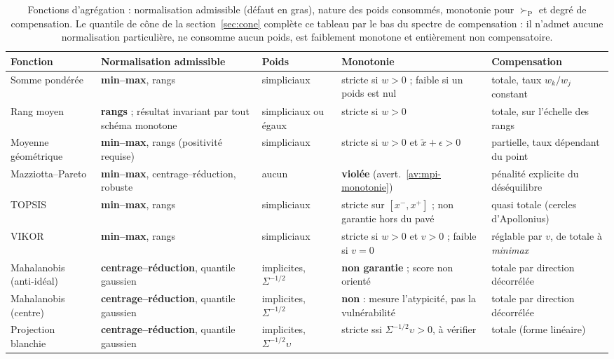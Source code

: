\documentclass[11pt,a4paper]{article}
\theoremstyle{definition}
\theoremstyle{remark}
\newcommand{\pareto}{\succ_{\mathrm{P}}}
\begin{document}
\medskip

\begin{table}[htbp]
  \centering
  \scriptsize
  \renewcommand{\arraystretch}{1.35}
  \begin{tabularx}{\textwidth}{@{}l Y l Y Y@{}}
    \toprule
    \textbf{Fonction} & \textbf{Normalisation admissible} & \textbf{Poids} &
    \textbf{Monotonie} & \textbf{Compensation} \\
    \midrule
    Somme pondérée &
    \textbf{min--max}, rangs &
    simpliciaux &
    stricte si $w > 0$ ; faible si un poids est nul &
    totale, taux $w_k/w_j$ constant \\
    Rang moyen &
    \textbf{rangs} ; résultat invariant par tout schéma monotone &
    simpliciaux ou égaux &
    stricte si $w > 0$ &
    totale, sur l'échelle des rangs \\
    Moyenne géométrique &
    \textbf{min--max}, rangs (positivité requise) &
    simpliciaux &
    stricte si $w > 0$ et $\tilde{x} + \epsilon > 0$ &
    partielle, taux dépendant du point \\
    Mazziotta--Pareto &
    \textbf{min--max}, centrage--réduction, robuste &
    aucun &
    \textbf{violée} (avert.~\ref{av:mpi-monotonie}) &
    pénalité explicite du déséquilibre \\
    TOPSIS &
    \textbf{min--max}, rangs &
    simpliciaux &
    stricte sur $[x^{-},x^{+}]$ ; non garantie hors du pavé &
    quasi totale (cercles d'Apollonius) \\
    VIKOR &
    \textbf{min--max}, rangs &
    simpliciaux &
    stricte si $w > 0$ et $v > 0$ ; faible si $v = 0$ &
    réglable par $v$, de totale à \emph{minimax} \\
    Mahalanobis (anti-idéal) &
    \textbf{centrage--réduction}, quantile gaussien &
    implicites, $\Sigma^{-1/2}$ &
    \textbf{non garantie} ; score non orienté &
    totale par direction décorrélée \\
    Mahalanobis (centre) &
    \textbf{centrage--réduction}, quantile gaussien &
    implicites, $\Sigma^{-1/2}$ &
    \textbf{non} : mesure l'atypicité, pas la vulnérabilité &
    totale par direction décorrélée \\
    Projection blanchie &
    \textbf{centrage--réduction}, quantile gaussien &
    implicites, $\Sigma^{-1/2}\upsilon$ &
    stricte ssi $\Sigma^{-1/2}\upsilon > 0$, à vérifier &
    totale (forme linéaire) \\
    \bottomrule
  \end{tabularx}
  \caption{Fonctions d'agrégation : normalisation admissible (défaut en gras), nature des
  poids consommés, monotonie pour $\pareto$ et degré de compensation. Le quantile de cône
  de la section~\ref{sec:cone} complète ce tableau par le bas du spectre de compensation :
  il n'admet aucune normalisation particulière, ne consomme aucun poids, est faiblement
  monotone et entièrement non compensatoire.}
  \label{tab:agregation-recap}
\end{table}
\end{document}
